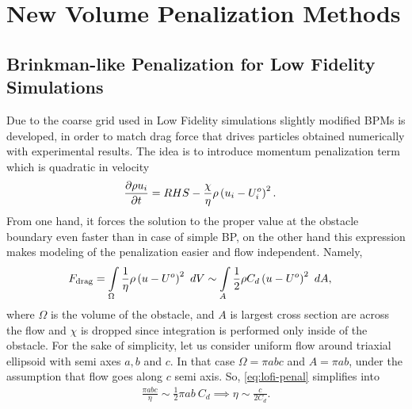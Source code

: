 \chapter{New Volume Penalization Methods}
\label{chapter:3}
\section{Brinkman-like Penalization for Low Fidelity Simulations}
Due to the coarse grid used in Low Fidelity simulations slightly modified BPMs is developed, in order to match drag force that drives particles obtained numerically with experimental results. The idea is to introduce momentum penalization term which is quadratic in velocity
\begin{align}
\frac {\partial \rho u_i}{\partial t} &= RHS - \frac \chi \eta \rho \left(u_i - U_i^o\right)^2. \label{eq:lofi-penal}
\end{align}
From one hand, it forces the solution to the proper value at the obstacle boundary even faster than in case of simple BP, on the other hand this expression makes modeling of the penalization easier and flow independent. Namely, 
\begin{align}
F_{\textmd{drag}} &= \int\displaylimits_\Omega \frac 1 \eta \rho \left(u - U^o\right)^2\ dV \sim \int \displaylimits_A \frac 12 \rho C_d \left(u - U^o\right)^2\ dA, \label{eq:lofi-penal}
\end{align}
where $\Omega$ is the volume of the obstacle, and $A$ is largest cross section are across the flow and $\chi$ is dropped since integration is performed only inside of the obstacle. For the sake of simplicity, let us consider uniform flow around triaxial ellipsoid with semi axes $a,b$ and $c$. In that case $\Omega = \pi a b c$ and $A = \pi a b$, under the assumption that flow goes along $c$ semi axis. So, \eqref{eq:lofi-penal} simplifies into
\begin{align}
\frac {\pi a b c}\eta \sim \frac 12 \pi a b\ C_d \implies \eta \sim \frac c{2C_d}.
\end{align}

